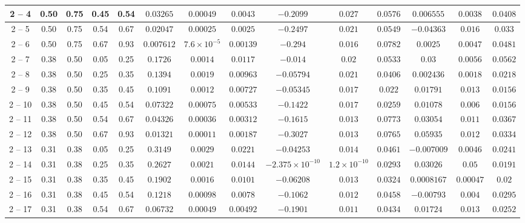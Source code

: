 \begin{longtable}{|*{14}{c|}}
\hline
2 -- 4 & 0.50 & 0.75 & 0.45 & 0.54 & $0.03265$ & $0.00049$ & $0.0043$ & $-0.2099$ & $0.027$ & $0.0576$ & $0.006555$ & $0.0038$ & $0.0408$ \\
\hline
2 -- 5 & 0.50 & 0.75 & 0.54 & 0.67 & $0.02047$ & $0.00025$ & $0.0025$ & $-0.2497$ & $0.021$ & $0.0549$ & $-0.04363$ & $0.016$ & $0.033$ \\
\hline
2 -- 6 & 0.50 & 0.75 & 0.67 & 0.93 & $0.007612$ & $7.6\times 10^{-5}$ & $0.00139$ & $-0.294$ & $0.016$ & $0.0782$ & $0.0025$ & $0.0047$ & $0.0481$ \\
\hline
2 -- 7 & 0.38 & 0.50 & 0.05 & 0.25 & $0.1726$ & $0.0014$ & $0.0117$ & $-0.014$ & $0.02$ & $0.0533$ & $0.03$ & $0.0056$ & $0.0562$ \\
\hline
2 -- 8 & 0.38 & 0.50 & 0.25 & 0.35 & $0.1394$ & $0.0019$ & $0.00963$ & $-0.05794$ & $0.021$ & $0.0406$ & $0.002436$ & $0.0018$ & $0.0218$ \\
\hline
2 -- 9 & 0.38 & 0.50 & 0.35 & 0.45 & $0.1091$ & $0.0012$ & $0.00727$ & $-0.05345$ & $0.017$ & $0.022$ & $0.01791$ & $0.013$ & $0.0156$ \\
\hline
2 -- 10 & 0.38 & 0.50 & 0.45 & 0.54 & $0.07322$ & $0.00075$ & $0.00533$ & $-0.1422$ & $0.017$ & $0.0259$ & $0.01078$ & $0.006$ & $0.0156$ \\
\hline
2 -- 11 & 0.38 & 0.50 & 0.54 & 0.67 & $0.04326$ & $0.00036$ & $0.00312$ & $-0.1615$ & $0.013$ & $0.0773$ & $0.03054$ & $0.011$ & $0.0367$ \\
\hline
2 -- 12 & 0.38 & 0.50 & 0.67 & 0.93 & $0.01321$ & $0.00011$ & $0.00187$ & $-0.3027$ & $0.013$ & $0.0765$ & $0.05935$ & $0.012$ & $0.0334$ \\
\hline
2 -- 13 & 0.31 & 0.38 & 0.05 & 0.25 & $0.3149$ & $0.0029$ & $0.0221$ & $-0.04253$ & $0.014$ & $0.0461$ & $-0.007009$ & $0.0046$ & $0.0241$ \\
\hline
2 -- 14 & 0.31 & 0.38 & 0.25 & 0.35 & $0.2627$ & $0.0021$ & $0.0144$ & $-2.375\times 10^{-10}$ & $1.2\times 10^{-10}$ & $0.0293$ & $0.03026$ & $0.05$ & $0.0191$ \\
\hline
2 -- 15 & 0.31 & 0.38 & 0.35 & 0.45 & $0.1902$ & $0.0016$ & $0.0101$ & $-0.06208$ & $0.013$ & $0.0324$ & $0.0008167$ & $0.00047$ & $0.02$ \\
\hline
2 -- 16 & 0.31 & 0.38 & 0.45 & 0.54 & $0.1218$ & $0.00098$ & $0.0078$ & $-0.1062$ & $0.012$ & $0.0458$ & $-0.00793$ & $0.004$ & $0.0295$ \\
\hline
2 -- 17 & 0.31 & 0.38 & 0.54 & 0.67 & $0.06732$ & $0.00049$ & $0.00492$ & $-0.1901$ & $0.011$ & $0.0434$ & $0.01724$ & $0.013$ & $0.0252$ \\

\end{longtable}
